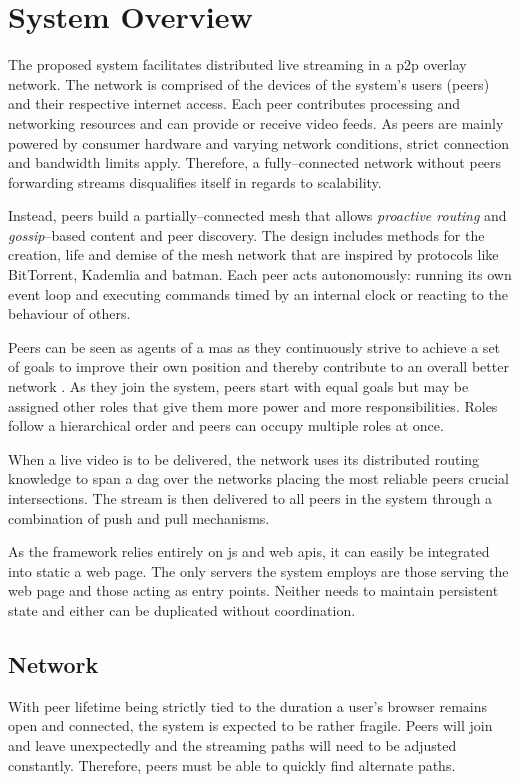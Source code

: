 \section{System Overview}\label{sec:design-system-overview}

The proposed system facilitates distributed live streaming in a \gls{p2p} overlay network. The network is comprised of the devices of the system's users (peers) and their respective internet access. Each peer contributes processing and networking resources and can provide or receive video feeds. As peers are mainly powered by consumer hardware and varying network conditions, strict connection and bandwidth limits apply. Therefore, a fully–connected network without peers forwarding streams disqualifies itself in regards to scalability.

Instead, peers build a partially–connected mesh that allows \textit{proactive routing} and \textit{gossip}–based content and peer discovery. The design includes methods for the creation, life and demise of the mesh network that are inspired by protocols like BitTorrent, Kademlia and \gls{batman}. Each peer acts autonomously: running its own event loop and executing commands timed by an internal clock or reacting to the behaviour of others.

Peers can be seen as agents of a \gls{mas} \cite{bdi-agents-theory-practice} as they continuously strive to achieve a set of goals to improve their own position and thereby contribute to an overall better network \cite[\S{V.B}]{coolstreaming-design-theory}.
As they join the system, peers start with equal goals but may be assigned other roles that give them more power and more responsibilities. Roles follow a hierarchical order and peers can occupy multiple roles at once.

When a live video is to be delivered, the network uses its distributed routing knowledge to span a \gls{dag} over the networks placing the most reliable peers crucial intersections. The stream is then delivered to all peers in the system through a combination of push and pull mechanisms.

As the framework relies entirely on \gls{js} and web \glspl{api}, it can easily be integrated into static a web page. The only servers the system employs are those serving the web page and those acting as entry points. Neither needs to maintain persistent state and either can be duplicated without coordination.

\subsection{Network}
With peer lifetime being strictly tied to the duration a user's browser remains open and connected, the system is expected to be rather fragile. Peers will join and leave unexpectedly and the streaming paths will need to be adjusted constantly. Therefore, peers must be able to quickly find alternate paths.


